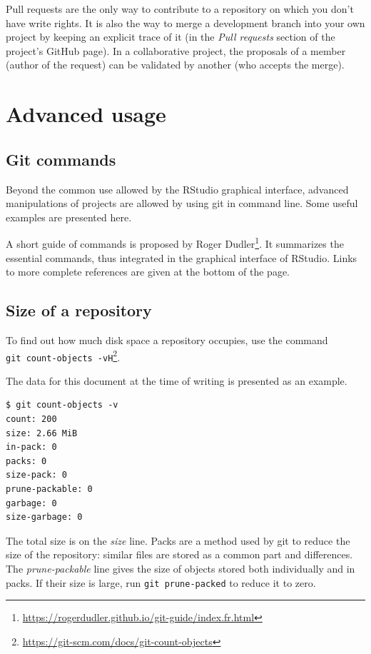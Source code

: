 \documentclass[
  12pt,
  american,
  a4paper,
  extrafontsizes,onecolumn,openright
  ]{memoir}
\newlength{\rf}
\begin{document}
Pull requests are the only way to contribute to a repository on which you don't have write rights.
It is also the way to merge a development branch into your own project by keeping an explicit trace of it (in the \emph{Pull requests} section of the project's GitHub page).
In a collaborative project, the proposals of a member (author of the request) can be validated by another (who accepts the merge).

\hypertarget{advanced-usage}{%
\section{Advanced usage}\label{advanced-usage}}

\hypertarget{git-commands}{%
\subsection{Git commands}\label{git-commands}}

Beyond the common use allowed by the RStudio graphical interface, advanced manipulations of projects are allowed by using git in command line.
Some useful examples are presented here.

A short guide of commands is proposed by Roger Dudler\footnote{\url{https://rogerdudler.github.io/git-guide/index.fr.html}}.
It summarizes the essential commands, thus integrated in the graphical interface of RStudio.
Links to more complete references are given at the bottom of the page.

\hypertarget{size-of-a-repository}{%
\subsection{Size of a repository}\label{size-of-a-repository}}

To find out how much disk space a repository occupies, use the command \texttt{git\ count-objects\ -vH}\footnote{\url{https://git-scm.com/docs/git-count-objects}}.

The data for this document at the time of writing is presented as an example.

\begin{verbatim}
$ git count-objects -v
count: 200
size: 2.66 MiB
in-pack: 0
packs: 0
size-pack: 0
prune-packable: 0
garbage: 0
size-garbage: 0
\end{verbatim}

The total size is on the \emph{size} line.
Packs are a method used by git to reduce the size of the repository: similar files are stored as a common part and differences.
The \emph{prune-packable} line gives the size of objects stored both individually and in packs.
If their size is large, run \texttt{git\ prune-packed} to reduce it to zero.
\end{document}
